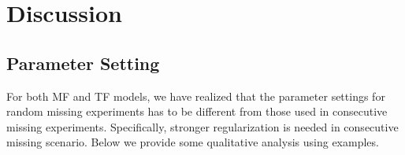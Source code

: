 \section{Discussion}  \label{sec:disc}



\subsection{Parameter Setting} \label{subsec:parameter}

For both MF and TF models, we have realized that the parameter settings for random missing experiments has to be different from those used in consecutive missing experiments. Specifically, stronger regularization is needed in consecutive missing scenario.
Below we provide some qualitative analysis using examples. 

